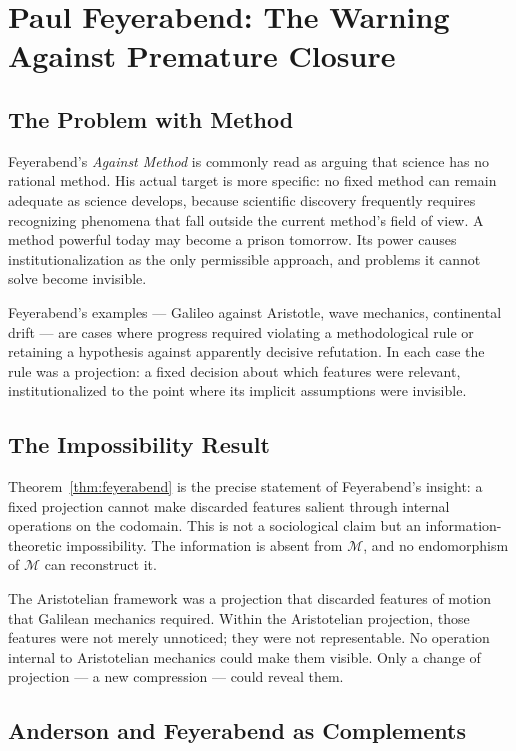\documentclass[12pt, a4paper, oneside]{book}
\newcommand{\M}{\mathcal{M}}
\begin{document}
\section{Paul Feyerabend: The Warning Against Premature Closure}

\subsection{The Problem with Method}

Feyerabend's \emph{Against Method} is commonly read as arguing that
science has no rational method. His actual target is more specific:
no fixed method can remain adequate as science develops, because
scientific discovery frequently requires recognizing phenomena that fall
outside the current method's field of view. A method powerful today may
become a prison tomorrow. Its power causes institutionalization as the
only permissible approach, and problems it cannot solve become invisible.

Feyerabend's examples --- Galileo against Aristotle, wave mechanics,
continental drift --- are cases where progress required violating a
methodological rule or retaining a hypothesis against apparently decisive
refutation. In each case the rule was a projection: a fixed decision
about which features were relevant, institutionalized to the point where
its implicit assumptions were invisible.

\subsection{The Impossibility Result}

Theorem~\ref{thm:feyerabend} is the precise statement of Feyerabend's
insight: a fixed projection cannot make discarded features salient
through internal operations on the codomain. This is not a sociological
claim but an information-theoretic impossibility. The information is
absent from $\M$, and no endomorphism of $\M$ can reconstruct it.

The Aristotelian framework was a projection that discarded features of
motion that Galilean mechanics required. Within the Aristotelian
projection, those features were not merely unnoticed; they were not
representable. No operation internal to Aristotelian mechanics could
make them visible. Only a change of projection --- a new compression ---
could reveal them.

\subsection{Anderson and Feyerabend as Complements}
\end{document}

